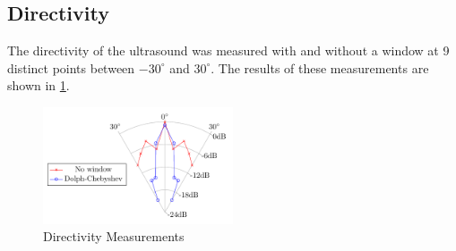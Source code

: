 \subsection{Directivity}
The directivity of the ultrasound was measured with and without a window at 9 distinct points between $-30^\circ$ and $30^\circ$. The results of these measurements are shown in \ref{6.2.1_fig:Directivity_measurements}.
\begin{center}
    \begin{figure}[h!]
        \centering
        \includegraphics[width=0.5\textwidth]{images/6_Measurements/Polar_PlotDirectivity_Measurement.pdf}
        \caption{Directivity Measurements}
        \label{6.2.1_fig:Directivity_measurements}
    \end{figure}
\end{center}
